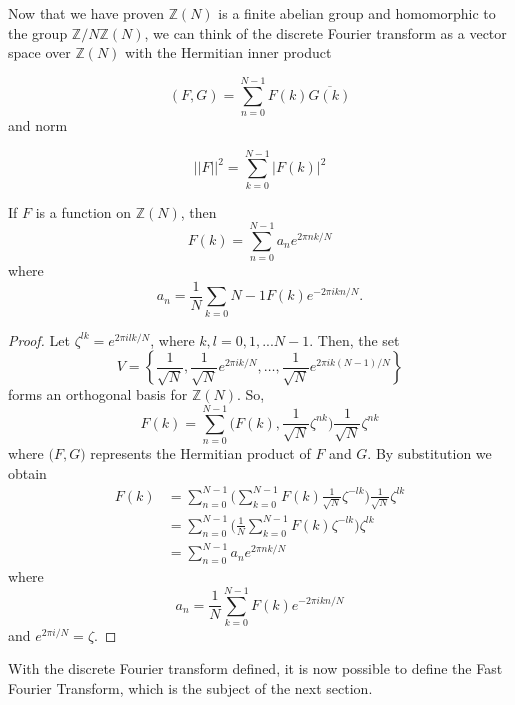 \documentclass[../article.tex]{subfiles}
\begin{document}
Now that we have proven $\mathbb{Z}(N)$ is a finite abelian group and homomorphic to the group $\mathbb{Z} /N\mathbb{Z}(N)$, we can think of the discrete Fourier transform as a vector space over $\mathbb{Z}(N)$ with the Hermitian inner product


\[
  (F,G) = \sum_{n=0}^{N-1} F(k) \overline{G(k)}
\]
and norm

\[
  ||F||^2 = \sum_{k=0}^{N-1} |F(k)|^2
\]


\begin{theorem}
If $F$ is a function on $\mathbb{Z}(N)$, then
\[
F(k) = \sum_{n=0}^{N-1} a_n e^{2 \pi nk/N}
\]
where
\[
a_n = \frac{1}{N} \sum_{k=0}{N-1} F(k) e^{-2 \pi ikn/N}.
\]
\end{theorem}
\begin{proof}
Let $\zeta^{lk} = e^{2 \pi i lk/N}$, where $k,l = 0,1,...N-1$. Then, the set
\[
V = \left\{ \frac{1}{\sqrt{N}}, \frac{1}{\sqrt{N}}e^{2 \pi i k/N}, \ldots, \frac{1}{\sqrt{N}}e^{2 \pi i k(N-1)/N} \right\}
\]
forms an orthogonal basis for $\mathbb{Z}(N)$. So,
\[
F(k) = \sum_{n=0}^{N-1} \Big(F(k), \frac{1}{\sqrt{N}}\zeta^{nk} \Big) \frac{1}{\sqrt{N}}\zeta^{nk}
\]
where $\big(F,G \big)$ represents the Hermitian product of $F$ and $G$. By substitution we obtain
\begin{align*}
F(k) &= \sum_{n=0}^{N-1} \Bigg(\sum_{k=0}^{N-1} F(k) \frac{1}{\sqrt{N}} \zeta^{-lk} \Bigg) \frac{1}{\sqrt{N}} \zeta^{lk} \\
&= \sum_{n=0}^{N-1} \Bigg(\frac{1}{N} \sum_{k=0}^{N-1} F(k) \zeta^{-lk} \Bigg) \zeta^{lk} \\
&= \sum_{n=0}^{N-1} a_n e^{2 \pi nk/N}
\end{align*}
where
\[
a_n = \frac{1}{N} \sum_{k=0}^{N-1} F(k) e^{-2 \pi ikn/N}
\]
and $e^{2 \pi i/N} = \zeta$.
\end{proof}

With the discrete Fourier transform defined, it is now possible to define the Fast Fourier Transform, which is the subject of the next section.
\end{document}

